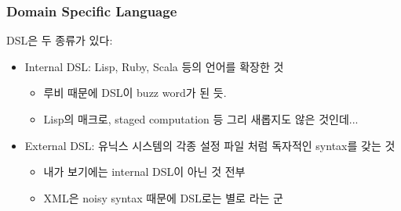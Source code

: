 \begin{frame}
\frametitle{Domain Specific Language}

DSL은 두 종류가 있다:
\begin{itemize}
\item Internal DSL: Lisp, Ruby, Scala  등의 언어를 확장한 것
    \begin{itemize}
    \item 루비 때문에 DSL이 buzz word가 된 듯.
    \item Lisp의 매크로, staged computation 등 그리 새롭지도 않은 것인데...
    \end{itemize}
\item External DSL: 유닉스 시스템의 각종 설정 파일 처럼 독자적인  syntax를 갖는 것
    \begin{itemize}
    \item 내가 보기에는 internal DSL이 아닌 것 전부
    \item XML은 noisy syntax 때문에 DSL로는 별로 라는 군
    \end{itemize}
\end{itemize}

\end{frame}
